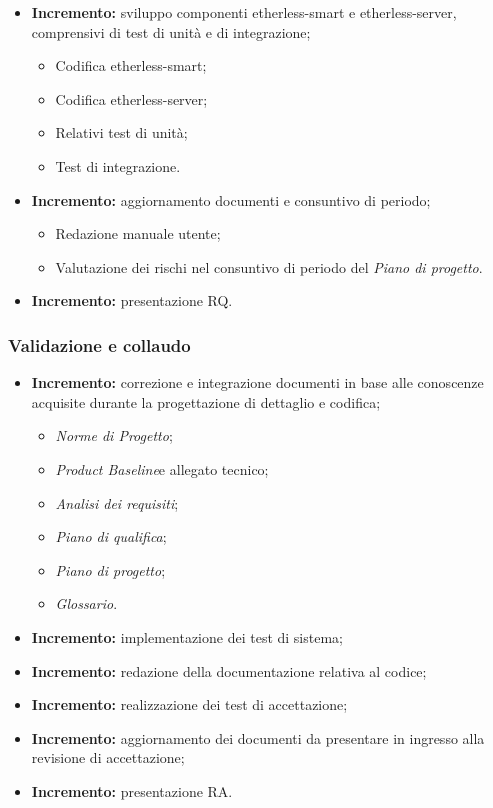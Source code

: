 \begin{itemize}
	\item \textbf{ Incremento:} sviluppo componenti etherless-smart e etherless-server, comprensivi di test di unità e di integrazione;
  \begin{itemize}
    \item Codifica etherless-smart;
    \item Codifica etherless-server;
    \item Relativi test di unità;
    \item Test di integrazione.
  \end{itemize}
	\item \textbf{ Incremento:} aggiornamento documenti e consuntivo di periodo;
  \begin{itemize}
    \item Redazione manuale utente;
    \item Valutazione dei rischi nel consuntivo di periodo del \textit{Piano di progetto}\docs.
  \end{itemize}
	\item \textbf{ Incremento:} presentazione RQ.
\end{itemize}
\subsubsection{Validazione e collaudo }
\begin{itemize}
  \item \textbf{ Incremento:} correzione e integrazione documenti in base alle conoscenze acquisite durante la progettazione di dettaglio e codifica;
  \begin{itemize}
    \item \textit{Norme di Progetto}\docs;
    \item \textit{Product Baseline}\glo e allegato tecnico;
    \item \textit{Analisi dei requisiti}\docs;
    \item \textit{Piano di qualifica}\docs;
    \item \textit{Piano di progetto}\docs;
    \item \textit{Glossario}\docs.
  \end{itemize}
	\item \textbf{ Incremento:} implementazione dei test di sistema;
	\item \textbf{ Incremento:} redazione della documentazione relativa al codice;
	\item \textbf{ Incremento:} realizzazione dei test di accettazione;
	\item \textbf{ Incremento:} aggiornamento dei documenti da presentare in ingresso alla revisione di accettazione;
	\item \textbf{ Incremento:} presentazione RA.
\end{itemize}
